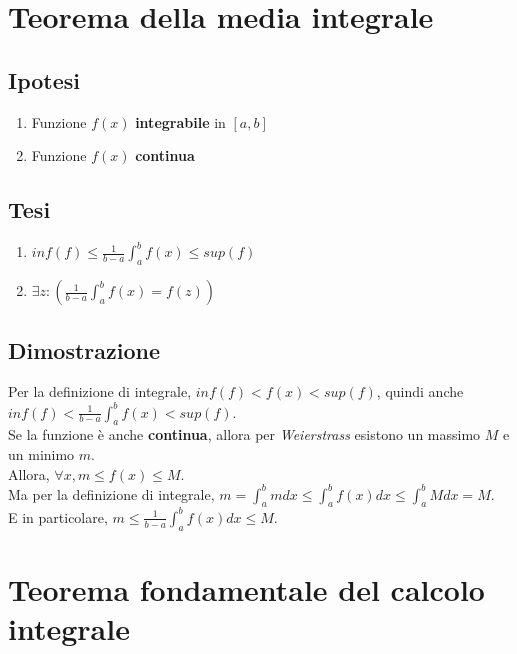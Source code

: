 \documentclass{article}
\begin{document}
\newpage

\section{Teorema della media integrale}

\begin{multicols}{2}
    \subsection{Ipotesi}
    \begin{enumerate}
        \item Funzione \(f(x)\) \textbf{integrabile} in \([a, b]\)
        \item Funzione \(f(x)\) \textbf{continua}
    \end{enumerate}
\columnbreak
    \subsection{Tesi}
    \begin{enumerate}
        \item \(inf(f) \leq \frac{1}{b - a} \int_a^b f(x) \leq sup(f) \)
        \item \(\exists z : (\frac{1}{b - a} \int_a^b f(x) = f(z))\)
    \end{enumerate}
\end{multicols}

\subsection{Dimostrazione}
Per la definizione di integrale, \(inf(f) < f(x) < sup(f)\), quindi anche \(inf(f) < \frac{1}{b - a} \int_a^b f(x) < sup(f) \).\\
Se la funzione è anche \textbf{continua}, allora per \textit{Weierstrass} esistono un massimo \(M\) e un minimo \(m\).\\
Allora, \(\forall x, m \leq f(x) \leq M\).\\
Ma per la definizione di integrale, \(m = \int_a^b m dx \leq \int_a^b f(x) dx \leq \int_a^b M dx = M \).\\
E in particolare, \(m \leq \frac{1}{b - a} \int_a^b f(x) dx \leq M\).

\newpage

\section{Teorema fondamentale del calcolo integrale}
\end{document}
